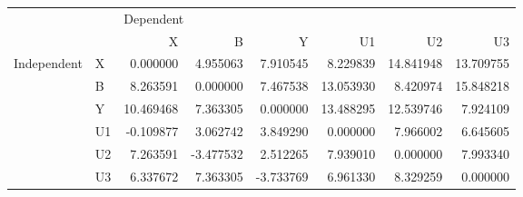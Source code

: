 \begin{tabular}{llrrrrrr}
\toprule
            &    & \multicolumn{6}{l}{Dependent} \\
            &    &          X &         B &         Y &         U1 &         U2 &         U3 \\
\midrule
Independent & X &   0.000000 &  4.955063 &  7.910545 &   8.229839 &  14.841948 &  13.709755 \\
            & B &   8.263591 &  0.000000 &  7.467538 &  13.053930 &   8.420974 &  15.848218 \\
            & Y &  10.469468 &  7.363305 &  0.000000 &  13.488295 &  12.539746 &   7.924109 \\
            & U1 &  -0.109877 &  3.062742 &  3.849290 &   0.000000 &   7.966002 &   6.645605 \\
            & U2 &   7.263591 & -3.477532 &  2.512265 &   7.939010 &   0.000000 &   7.993340 \\
            & U3 &   6.337672 &  7.363305 & -3.733769 &   6.961330 &   8.329259 &   0.000000 \\
\bottomrule
\end{tabular}
